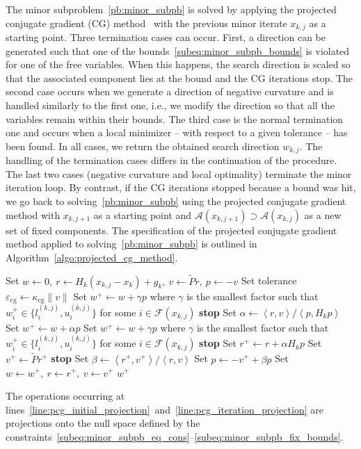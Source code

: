 \documentclass{article}
\numberwithin{equation}{section}
\newcommand{\calA}{{\mathcal{A}}}
\newcommand{\calF}{{\mathcal{F}}}
\newcommand{\inner}[2]{\left\langle {#1} , {#2} \right\rangle} %
\theoremstyle{plain}
\begin{document}
The minor subproblem~\eqref{pb:minor_subpb} is solved by applying the projected conjugate gradient (CG) method~\cite{gould-etal:2001} with the previous minor iterate $x_{k,j}$ as a starting point. Three termination cases can occur. First, a direction can be generated such that one of the bounds~\eqref{subeq:minor_subpb_bounds} is violated for one of the free variables. When this happens, the search direction is scaled so that the associated component lies at the bound and the CG iterations stop. The second case occurs when we generate a direction of negative curvature and is handled similarly to the first one, i.e., we modify the direction so that all the variables remain within their bounds. The third case is the normal termination one and occurs when a local minimizer -- with respect to a given tolerance -- has been found. In all cases, we return the obtained search direction $w_{k,j}$. The handling of the termination cases differs in the continuation of the procedure. The last two cases (negative curvature and local optimality) terminate the minor iteration loop. By contrast, if the CG iterations stopped because a bound was hit, we go back to solving~\eqref{pb:minor_subpb} using the projected conjugate gradient method with $x_{k,j+1}$ as a starting point and $\calA(x_{k,j+1}) \supset \calA(x_{k,j})$ as a new set of fixed components.
The specification of the projected conjugate gradient method applied to solving~\eqref{pb:minor_subpb} is outlined in Algorithm~\ref{algo:projected_cg_method}.
\begin{algorithm}
	\caption{The projected conjugate gradient method applied to~\eqref{pb:minor_subpb}}\label{algo:projected_cg_method}
	\begin{algorithmic}[1]
		\State\label{line:pcg_initial_projection}Set $w \gets 0,\ r \gets H_k(x_{k,j}-x_k)+g_k,\ v\gets \tilde{P}r,\ p \gets -v$
		\State Set tolerance $\varepsilon_{\mathrm{cg}} \gets \kappa_{\mathrm{cg}}\|v\|$
		\Repeat
		\If{$\inner{p}{H_kp}\le 0$}
		\State Set $w^+ \gets w + \gamma p$ where $\gamma$ is the smallest factor such that $w^+_i \in \{l^{(k,j)}_i,u^{(k,j)}_i\}$ for some $i \in \calF(x_{k,j})$
		\State \textbf{stop}
		\EndIf
		\State Set $\alpha \gets \inner{r}{v} / \inner{p}{H_kp}$
		\State Set $w^+ \gets w+\alpha p$
		\State Set $w^+ \gets w + \gamma p$ where $\gamma$ is the smallest factor such that $w^+_i \in \{l^{(k,j)}_i,u^{(k,j)}_i\}$ for some $i \in \calF(x_{k,j})$
		\State \textbf{stop}
		\EndIf
		\State Set $r^+ \gets r + \alpha H_kp$
		\State Set $v^+\gets \tilde{P}r^+$ \label{line:pcg_iteration_projection} 
		\If{$\sqrt{\inner{r^+}{v^+}} < \varepsilon_{\mathrm{cg}}$} \textbf{stop}
		\EndIf
		\State Set $\beta \gets \inner{r^+}{v^+} / \inner{r}{v}$ 
		\State Set $p \gets -v^+ + \beta p$
		\State Set $w\gets w^+,\ r \gets r^+,\ v \gets v^+$
		\Until{$2(n-m-|\calA(x_{k,j})|)$ iterations have been done} 
		\State{}
		\Return $w^+$
	\end{algorithmic}
\end{algorithm} 
The operations occurring at lines~\ref{line:pcg_initial_projection}~and~\ref{line:pcg_iteration_projection} are projections onto the null space defined by the constraints~\eqref{subeq:minor_subpb_eq_cons}--\eqref{subeq:minor_subpb_fix_bounds}.
\end{document}
